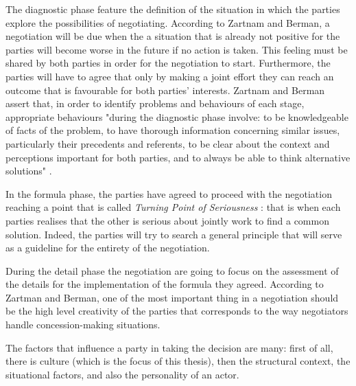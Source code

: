 \documentclass[../main.tex]{subfiles}
\begin{document}
The diagnostic phase feature the definition of the situation in which the parties explore the possibilities of negotiating. According to Zartnam and Berman, a negotiation will be due when the a situation that is already not positive for the parties will become worse in the future if no action is taken. This feeling must be shared by both parties in order for the negotiation to start. Furthermore, the parties will have to agree that only by making a joint effort they can reach an outcome that is favourable for both parties' interests. Zartnam and Berman assert that, in order to identify problems and behaviours of each stage, appropriate behaviours "during the diagnostic phase involve: to be knowledgeable of facts of the problem, to have thorough information concerning similar issues, particularly their precedents and referents, to be clear about the context and perceptions important for both parties, and to always be able to think alternative solutions" \autocite[98]{garcia}.

In the formula phase, the parties have agreed to proceed with the negotiation reaching a point that is called \textit{Turning Point of Seriousness} \autocite[3]{zartman1982practical}: that is when each parties realises that the other is serious about jointly work to find a common solution. Indeed, the parties will try to search a general principle that will serve as a guideline for the entirety of the negotiation.

During the detail phase the negotiation are going to focus on the assessment of the details for the implementation of the formula they agreed. According to Zartman and Berman, one of the most important thing in a negotiation should be the high level creativity of the parties that corresponds to  the way negotiators handle concession-making situations.

The factors that influence a party in taking the decision are many: first of all, there is culture (which is the focus of this thesis), then the structural context, the situational factors, and also the personality of an actor.
\pagebreak 
\end{document}
